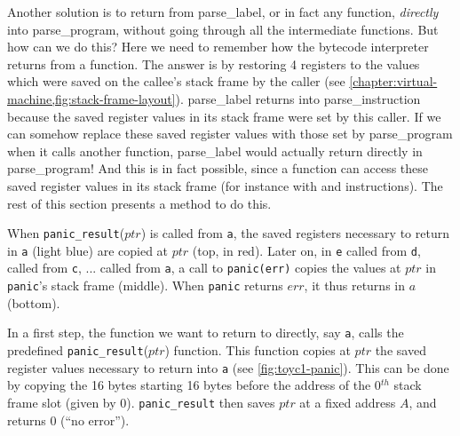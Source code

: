 Another solution is to return from parse\_label, or in fact any function, {\em
directly} into parse\_program, without going through all the intermediate
functions. But how can we do this? Here we need to remember how the bytecode
interpreter returns from a function. The answer is by restoring 4 registers to
the values which were saved on the callee's stack frame by the caller (see
\cref{chapter:virtual-machine,fig:stack-frame-layout}). parse\_label returns
into parse\_instruction because the saved register values in its stack frame
were set by this caller. If we can somehow replace these saved register values
with those set by parse\_program when it calls another function, parse\_label
would actually return directly in parse\_program! And this is in fact possible,
since a function can access these saved register values in its stack frame (for
instance with  and  instructions). The rest of this section
presents a method to do this.

\begin{Figure}
  

  \caption{When {\tt panic\_result}($ptr$) is called from {\tt a}, the saved
  registers necessary to return in {\tt a} (light blue) are copied at $ptr$
  (top, in red). Later on, in {\tt e} called from {\tt d}, called from {\tt c},
  ... called from {\tt a}, a call to {\tt panic(err)} copies the values at
  $ptr$ in {\tt panic}'s stack frame (middle). When {\tt panic} returns $err$,
  it thus returns in $a$ (bottom).}\label{fig:toyc1-panic}
\end{Figure}

In a first step, the function we want to return to directly, say {\tt a}, calls
the predefined {\tt panic\_result}($ptr$) function. This function copies at
$ptr$ the saved register values necessary to return into {\tt a} (see
\cref{fig:toyc1-panic}). This can be done by copying the 16 bytes starting 16
bytes before the address of the 0$^{th}$ stack frame slot (given by 
0). {\tt panic\_result} then saves $ptr$ at a fixed address $A$, and returns 0
(``no error'').

